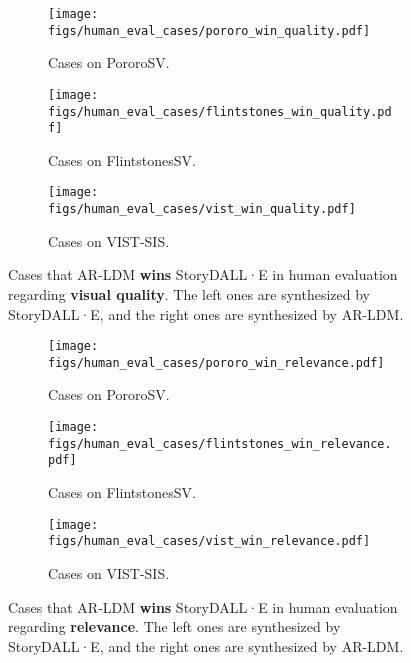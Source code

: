 \documentclass[10pt,twocolumn,letterpaper]{article}
\begin{document}
\begin{figure*}[!h]
\begin{subfigure}{0.32\linewidth}
\centering
\texttt{[image: figs/human\_eval\_cases/pororo\_win\_quality.pdf]}
\caption{Cases on PororoSV.}
\end{subfigure}
\hfill
\begin{subfigure}{0.32\linewidth}
\centering
\texttt{[image: figs/human\_eval\_cases/flintstones\_win\_quality.pdf]}
\caption{Cases on FlintstonesSV.}
\end{subfigure}
\hfill
\begin{subfigure}{0.32\linewidth}
\centering
\texttt{[image: figs/human\_eval\_cases/vist\_win\_quality.pdf]}
\caption{Cases on VIST-SIS.}
\end{subfigure}
\caption{Cases that AR-LDM \textbf{wins} StoryDALL·E in human evaluation regarding \textbf{visual quality}. The left ones are synthesized by StoryDALL·E, and the right ones are synthesized by AR-LDM.}
\label{fig:win_quality}
\end{figure*}

\begin{figure*}[!h]
\begin{subfigure}{0.32\linewidth}
\centering
\texttt{[image: figs/human\_eval\_cases/pororo\_win\_relevance.pdf]}
\caption{Cases on PororoSV.}
\end{subfigure}
\hfill
\begin{subfigure}{0.32\linewidth}
\centering
\texttt{[image: figs/human\_eval\_cases/flintstones\_win\_relevance.pdf]}
\caption{Cases on FlintstonesSV.}
\end{subfigure}
\hfill
\begin{subfigure}{0.32\linewidth}
\centering
\texttt{[image: figs/human\_eval\_cases/vist\_win\_relevance.pdf]}
\caption{Cases on VIST-SIS.}
\end{subfigure}
\caption{Cases that AR-LDM \textbf{wins} StoryDALL·E in human evaluation regarding \textbf{relevance}. The left ones are synthesized by StoryDALL·E, and the right ones are synthesized by AR-LDM.}
\label{fig:win_relevance}
\end{figure*}
\end{document}
